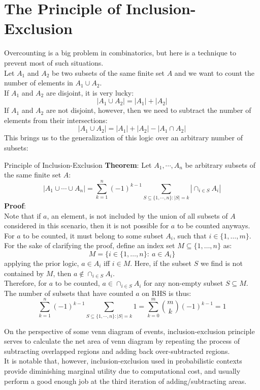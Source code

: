 \section{The Principle of Inclusion-Exclusion}
Overcounting is a big problem in combinatorics, but here is a technique to prevent most of such situations. \\
Let $A_1$ and $A_2$ be two subsets of the same finite set $A$ and we want to count the number of elements in $A_1 \cup A_2$. \\
If $A_1$ and $A_2$ are disjoint, it is very lucky:
\[|A_1 \cup A_2| = |A_1| + |A_2|\]
If $A_1$ and $A_2$ are not disjoint, however, then we need to subtract the number of elements from their intersections:
\[|A_1 \cup A_2| = |A_1| + |A_2| - |A_1 \cap A_2|\]
This brings us to the generalization of this logic over an arbitrary number of subsets:
\begin{ln-theorem}{Principle of Inclusion-Exclusion}{}
    \textbf{Theorem}: Let $A_1, \cdots, A_n$ be arbitrary subsets of the same finite set $A$:
    \[|A_1 \cup \cdots \cup A_n| = \sum_{k = 1}^n {(-1)}^{k - 1} \sum_{S \subseteq \{1, \cdots, n\}:|S| = k} |\cap_{i \in S}A_i|\]
    \tcblower
    \textbf{Proof}: \\
    Note that if $a$, an element, is not included by the union of all subsets of $A$ considered in this scenario, then it is not possible for $a$ to be counted anyways. \\
    For $a$ to be counted, it must belong to some subset $A_i$, such that $i \in \{1, \dots, m\}$. \\
    For the sake of clarifying the proof, define an index set $M \subseteq \{1, \dots, n\}$ as:
    \[M = \{i \in \{1, \dots, n\}:\ a \in A_i\}\]
    applying the prior logic, $a \in A_i$ iff $i \in M$. Here, if the subset $S$ we find is not contained by $M$, then $a \notin \cap_{i \in S}A_i$. \\
    Therefore, for $a$ to be counted, $a \in \cap_{i \in S}A_i$ for any non-empty subset $S \subseteq M$. \\
    The number of subsets that have counted $a$ on RHS is thus:
    \[\sum_{k = 1}^n {(-1)}^{k - 1} \sum_{S \subseteq \{1, \cdots, n\}:|S| = k} 1 = \sum_{k = 0}^m \binom{m}{k} {(-1)}^{k - 1} = 1\]
\end{ln-theorem}
On the perspective of some venn diagram of events, inclusion-exclusion principle serves to calculate the net area of venn diagram by repeating the process of subtracting overlapped regions and adding back over-subtracted regions. \\
It is notable that, however, inclusion-exclusion used in probabilistic contexts provide diminishing marginal utility due to computational cost, and usually perform a good enough job at the third iteration of adding/subtracting areas.

